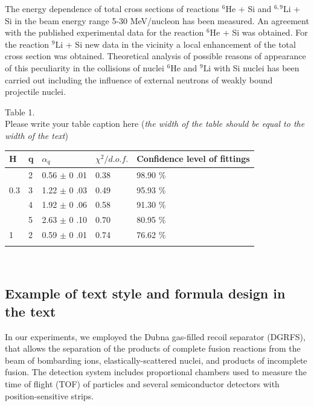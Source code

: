 \documentclass[12pt,a4paper,twoside]{article}
\begin{document}
The energy dependence of total cross sections of reactions $^6\text{He}$ + Si and $^{6,9}\text{Li}$ + Si in the beam energy range 5-30 MeV/nucleon has been measured. An agreement with the published experimental data for the reaction $^6$He + Si was obtained. For the reaction $^9\text{Li}$ + Si new data in the vicinity a local enhancement of the total cross section was obtained. Theoretical analysis of possible reasons of appearance of this peculiarity in the collisions of nuclei $^6\text{He}$ and $^9\text{Li}$ with Si nuclei has been carried out including the influence of external neutrons of weakly bound projectile nuclei.
\\[0.3cm]

\begin{flushleft}
Table 1.\\
Please write your table caption here (\textit{the width of the table should be equal to the width of the text})\\
\begin{tabular}{p{1cm}|p{2.8cm}|p{3cm}|p{3cm}|p{3cm}}
\hline\noalign{\smallskip}
H&   q &  $\alpha_q$&   $\chi^{2}/d.o.f.$  & Confidence level of fittings\\ \hline\noalign{\smallskip}
 &2 &0.56 $\pm$  0 .01 & 0.38 & 98.90 \% \\ \cline{2-5}
0.3		&3 &1.22 $\pm$  0 .03 & 0.49 & 95.93 \% \\\cline{2-5}
		&4 &1.92 $\pm$  0 .06 & 0.58 & 91.30 \% \\\cline{2-5}
		&5 &2.63 $\pm$  0 .10 & 0.70 & 80.95 \% \\\hline\noalign{\smallskip}
1 	&2 &0.59 $\pm$  0 .01  &0.74 & 76.62 \% \\ \hline\noalign{\smallskip}
\end{tabular}\\[0.3cm]
\end{flushleft}

\subsection*{Example of text style and formula design in the text}


In our experiments, we employed the Dubna gas-filled recoil separator (DGRFS), that allows the separation of the products of complete fusion reactions from the beam of bombarding ions, elastically-scattered nuclei, and products of incomplete fusion. The detection system includes proportional chambers used to measure the time of flight (TOF) of particles and several semiconductor detectors with position-sensitive strips. 
\end{document}
